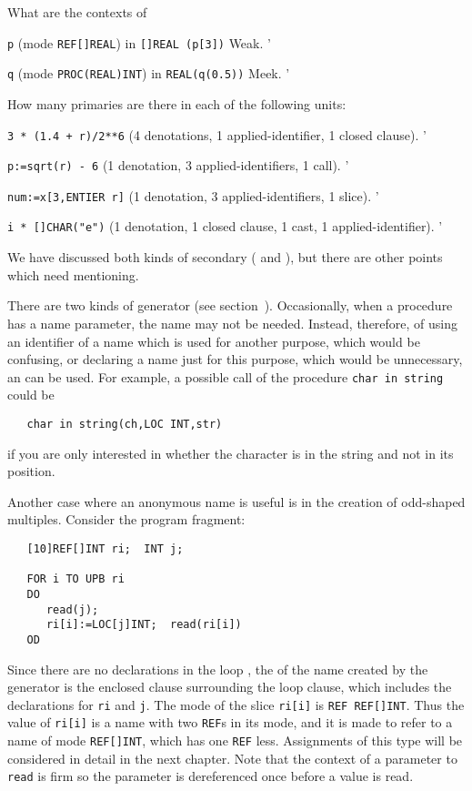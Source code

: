 \begin{exercise}
\item What are the contexts of
\begin{subex}
\item \verb|p| (mode \verb|REF[]REAL|) in \verb|[]REAL (p[3])|
\subans Weak.
'
\item \verb|q| (mode \verb|PROC(REAL)INT|) in \verb|REAL(q(0.5))|
\subans Meek.
'
\end{subex}
\item How many primaries are there in each of the following units:
\begin{subex}
\item \verb|3 * (1.4 + r)/2**6|  (4 denotations, 1
applied-identifier, 1 closed clause).
'
\item \verb|p:=sqrt(r) - 6|  (1 denotation, 3
applied-identifiers, 1 call).
'
\item \verb|num:=x[3,ENTIER r]|  (1 denotation, 3
applied-identifiers, 1 slice).
'
\item \verb|i * []CHAR("e")| \subans (1 denotation, 1 closed clause,
1 cast, 1 applied-identifier).
'
\end{subex}
\end{exercise}

We have discussed both kinds of secondary (
and ), but there are other points which
need mentioning.

There are two kinds of generator (see section~).
Occasionally, when a procedure has a name parameter, the name may not
be needed. Instead, therefore, of using an identifier of a name which
is used for another purpose, which would be confusing, or declaring a
name just for this purpose, which would be unnecessary, an
 can be used. For example, a
possible call of the procedure \verb|char in string| could be
\begin{verbatim}
   char in string(ch,LOC INT,str)
\end{verbatim}
\noindent
if you are only interested in whether the character is in the string
and not in its position.

Another case where an anonymous name is useful is in the creation of
odd-shaped multiples.  Consider the program fragment:
\begin{verbatim}
   [10]REF[]INT ri;  INT j;
   
   FOR i TO UPB ri
   DO
      read(j);
      ri[i]:=LOC[j]INT;  read(ri[i])
   OD
\end{verbatim}
\noindent
Since there are no declarations in the loop ,
the  of the name created by the generator is the
enclosed clause surrounding the loop clause, which includes the
declarations for \verb|ri| and \verb|j|.  The mode of the slice
\verb|ri[i]| is \verb|REF REF[]INT|.  Thus the value of \verb|ri[i]| is
a name with two \verb|REF|s in its mode, and it is made to refer to a
name of mode \verb|REF[]INT|, which has one \verb|REF| less. 
Assignments of this type will be considered in detail in the next
chapter. Note that the context of a parameter to \verb|read| is firm
so the parameter is dereferenced once before a value is read.

